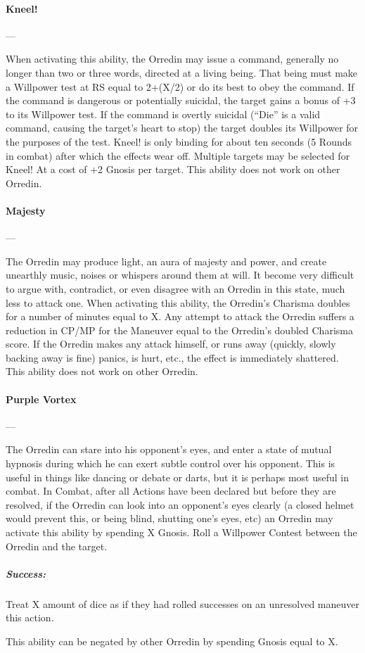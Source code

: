 \documentclass[oneside,11pt,english]{book}
\begin{document}
\paragraph{\large\label{man:Kneel!}Kneel!}---\quad{\large[X]}\par
When activating this ability, the Orredin may issue a command, generally no longer than two or three words, directed at a living being. That being must make a Willpower test at RS equal to 2+(X/2) or do its best to obey the command. If the command is dangerous or potentially suicidal, the target gains a bonus of +3 to its Willpower test. If the command is overtly suicidal (“Die” is a valid command, causing the 
target’s heart to stop) the target doubles its Willpower for the purposes of the test. Kneel! is only binding 
for about ten seconds (5 Rounds in combat) after which the effects wear off. Multiple targets may be selected for Kneel! At a cost of +2 Gnosis per target. This ability does not work on other Orredin. 


\paragraph{\large\label{man:Majesty}Majesty}---\quad{\large[X]}\par
The Orredin may produce light, an aura of majesty and power, and create unearthly music, noises or 
whispers around them at will. It become very difficult to argue with, contradict, or even disagree with an 
Orredin in this state, much less to attack one. When activating this ability, the Orredin's Charisma doubles for a number of minutes equal to X. Any attempt to attack the Orredin suffers a reduction in CP/MP for 
the Maneuver equal to the Orredin's doubled Charisma score. 
If the Orredin makes any attack himself, or runs away (quickly, slowly backing away is fine) panics, is hurt, etc., the effect is immediately shattered. 
This ability does not work on other Orredin. 


\paragraph{\large\label{man:Purple Vortex}Purple Vortex}---\quad{\large[X]}\par
The Orredin can stare into his opponent’s eyes, and enter a state of mutual hypnosis during which he can exert subtle control over his opponent. This is useful in things like dancing or debate or darts, but it is perhaps most useful in combat. 
In Combat, after all Actions have been declared but before they are resolved, if the Orredin can look into 
an opponent’s eyes clearly (a closed helmet would prevent this, or being blind, shutting one’s eyes, etc) 
an Orredin may activate this ability by spending X Gnosis. Roll a Willpower Contest between the Orredin and the target.
\vspace*{-15pt}\subparagraph{Success:} Treat X amount of dice as if they had rolled successes on an unresolved maneuver this action.\par
This ability can be negated by other Orredin by spending Gnosis equal to X.
\end{document}
